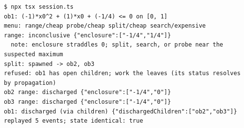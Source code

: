 \begin{Verbatim}[fontsize=\small,frame=leftline,rulecolor=\color{accentmid},framesep=3mm,xleftmargin=3mm]
$ npx tsx session.ts
ob1: (-1)*x0^2 + (1)*x0 + (-1/4) <= 0 on [0, 1]
menu: range/cheap probe/cheap split/cheap search/expensive
range: inconclusive {"enclosure":["-1/4","1/4"]}
  note: enclosure straddles 0; split, search, or probe near the suspected maximum
split: spawned -> ob2, ob3
refused: ob1 has open children; work the leaves (its status resolves by propagation)
ob2 range: discharged {"enclosure":["-1/4","0"]}
ob3 range: discharged {"enclosure":["-1/4","0"]}
ob1: discharged (via children) {"dischargedChildren":["ob2","ob3"]}
replayed 5 events; state identical: true
\end{Verbatim}
